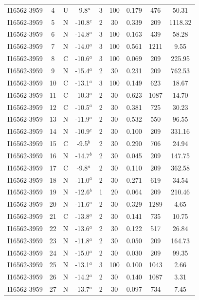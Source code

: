 \begin{table}
\begin{tabular}{ccccccccc}
I16562-3959 & 4 & U & -9.8$^{a}$ & 3 & 100 & 0.179 & 476 & 50.31 \\
I16562-3959 & 5 & N & -10.8$^{c}$ & 2 & 30 & 0.339 & 209 & 1118.32 \\
I16562-3959 & 6 & N & -14.8$^{a}$ & 3 & 100 & 0.163 & 439 & 58.28 \\
I16562-3959 & 7 & N & -14.0$^{a}$ & 3 & 100 & 0.561 & 1211 & 9.55 \\
I16562-3959 & 8 & C & -10.6$^{a}$ & 3 & 100 & 0.069 & 209 & 225.95 \\
I16562-3959 & 9 & N & -15.4$^{a}$ & 2 & 30 & 0.231 & 209 & 762.53 \\
I16562-3959 & 10 & C & -13.1$^{a}$ & 3 & 100 & 0.149 & 623 & 18.67 \\
I16562-3959 & 11 & C & -10.3$^{a}$ & 2 & 30 & 0.623 & 1087 & 14.70 \\
I16562-3959 & 12 & C & -10.5$^{a}$ & 2 & 30 & 0.381 & 725 & 30.23 \\
I16562-3959 & 13 & N & -11.9$^{a}$ & 2 & 30 & 0.532 & 550 & 96.55 \\
I16562-3959 & 14 & N & -10.9$^{c}$ & 2 & 30 & 0.100 & 209 & 331.16 \\
I16562-3959 & 15 & C & -9.5$^{b}$ & 2 & 30 & 0.290 & 706 & 24.94 \\
I16562-3959 & 16 & N & -14.7$^{b}$ & 2 & 30 & 0.045 & 209 & 147.75 \\
I16562-3959 & 17 & C & -9.8$^{a}$ & 2 & 30 & 0.110 & 209 & 362.58 \\
I16562-3959 & 18 & N & -11.0$^{a}$ & 2 & 30 & 0.271 & 619 & 34.54 \\
I16562-3959 & 19 & N & -12.6$^{b}$ & 1 & 20 & 0.064 & 209 & 210.46 \\
I16562-3959 & 20 & N & -11.6$^{a}$ & 2 & 30 & 0.329 & 1289 & 4.65 \\
I16562-3959 & 21 & C & -13.8$^{a}$ & 2 & 30 & 0.141 & 735 & 10.75 \\
I16562-3959 & 22 & N & -13.6$^{a}$ & 2 & 30 & 0.122 & 517 & 26.84 \\
I16562-3959 & 23 & N & -11.8$^{a}$ & 2 & 30 & 0.050 & 209 & 164.73 \\
I16562-3959 & 24 & N & -15.0$^{a}$ & 2 & 30 & 0.030 & 209 & 99.35 \\
I16562-3959 & 25 & N & -13.1$^{a}$ & 3 & 100 & 0.100 & 1043 & 2.66 \\
I16562-3959 & 26 & N & -14.2$^{a}$ & 2 & 30 & 0.140 & 1087 & 3.31 \\
I16562-3959 & 27 & N & -13.7$^{a}$ & 2 & 30 & 0.097 & 734 & 7.45 \\

\end{tabular}
\end{table}
